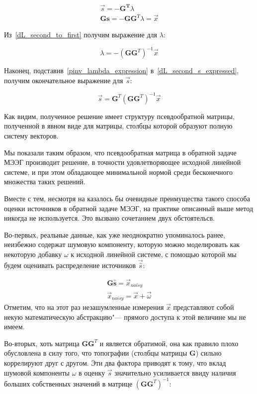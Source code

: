 \begin{gather}
    \vec{s} = - \mathbf{G^T}\lambda
    \label{dL_second_s_expressed}\\
    \mathbf{Gs} = - \mathbf{G} \mathbf{G}^T\lambda = \vec{x}
    \label{dL_second_to_first}
\end{gather}

Из~\ref{dL_second_to_first} получим выражение для $\lambda$:

\begin{equation}
    \lambda = - {(\mathbf{G}\mathbf{G}^T)}^{-1}\vec{x}
    \label{pinv_lambda_expression}
\end{equation}

Наконец, подставив~\ref{pinv_lambda_expression} в~\ref{dL_second_s_expressed}, получим
окончательное выражение для $\vec{s}$:

\begin{equation}
    \vec{s} = \mathbf{G}^T{(\mathbf{GG}^T)}^{-1}\vec{x}
\end{equation}

Как видим, полученное решение имеет структуру псевдообратной матрицы,
полученной в явном виде для матрицы, столбцы которой образуют полную систему
векторов.

Мы показали таким образом, что псевдообратная матрица в обратной задаче МЭЭГ
производит решение, в точности удовлетворяющее исходной линейной системе, и при
этом обладающее минимальной нормой среди бесконечного множества таких решений.

Вместе с тем, несмотря на казалось бы очевидные преимущества такого способа
оценки источников в обратной задаче МЭЭГ, на практике описанный выше метод
никогда не используется. Это вызвано сочетанием двух обстоятельсв. 

Во-первых, реальные данные, как уже неоднократно упоминалось ранее, неизбежно
содержат шумовую компоненту, которую можно моделировать как некоторую добавку
$\omega$ к исходной линейной системе, с помощью которой мы будем оценивать
распределение источников $\vec{\hat{s}}$:

\begin{gather}
    \mathbf{G\hat{s}} = \vec{x}_{noisy}
    \label{original_linear_w_noise}\\
    \vec{x}_{noisy} = \vec{x} + \vec{\omega}
\end{gather}
Отметим, что на этот раз незашумленные измерения $\vec{x}$ представляют
собой некую математическую абстракцию"--- прямого доступа к этой величине мы
не имеем.

Во-вторых, хоть матрица $\mathbf{G}\mathbf{G}^T$ и является обратимой, она как
правило плохо обусловлена в силу того, что топографии (столбцы матрицы
$\mathbf{G}$) сильно коррелируют друг с другом.  Эти два фактора
приводят к тому, что вклад шумовой компоненты $\omega$ в оценку $\vec{s}$
значительно усиливается ввиду наличия больших собственных значений в матрице
${(\mathbf{G}\mathbf{G}^T)}^{-1}$:


